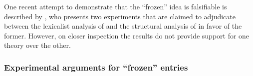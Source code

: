 
%			



One recent attempt to demonstrate that the ``frozen'' idea is falsifiable is described by \cite{fadlon12}, who presents two experiments that are claimed to adjudicate between the lexicalist analysis of \cite{reinhartsiloni05} and the structural analysis of \cite{arad05} in favor of the former. However, on closer inspection the results do not provide support for one theory over the other.

		\subsubsection{Experimental arguments for ``frozen'' entries \citep{fadlon12}}  